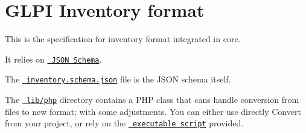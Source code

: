 \chapter{GLPI Inventory format}
\hypertarget{md_public_2glpi_2vendor_2glpi-project_2inventory__format_2_r_e_a_d_m_e}{}\label{md_public_2glpi_2vendor_2glpi-project_2inventory__format_2_r_e_a_d_m_e}
This is the specification for inventory format integrated in  core.

It relies on \href{https://json-schema.org}{\texttt{ JSON Schema}}.

The \href{inventory.schema.json}{\texttt{ inventory.\+schema.\+json}} file is the JSON schema itself.

The \href{lib/php}{\texttt{ lib/php}} directory contains a PHP class that cans handle conversion from  files to new format; with some adjustments. You can either use directly {\ttfamily Convert} from your project, or rely on the \href{bin/convert}{\texttt{ executable script}} provided. 